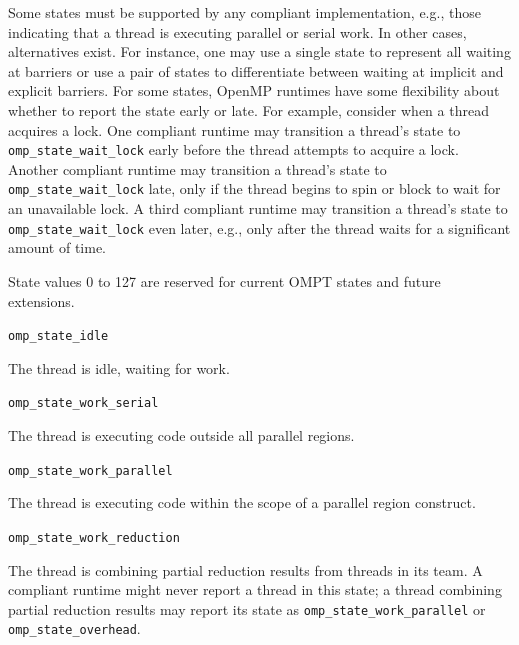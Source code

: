 \documentclass{article}
\newcommand{\descheader}[1]{{\needspace{3\baselineskip}\vspace{1em}\noindent \fbox{#1}}}
\begin{document}
Some states must be supported by any compliant implementation, e.g., those indicating that a thread is executing parallel or serial work. In other cases, alternatives exist. For instance, one may use a single state to represent all waiting at barriers or use a pair of states to differentiate between waiting at implicit and explicit barriers.
For some states, OpenMP runtimes have some flexibility about whether to report the state early or late.
For example, consider when a thread acquires a lock. One
compliant runtime may transition a thread's state to 
\verb|omp_state_wait_lock|  early before the thread attempts to acquire a
lock. Another compliant runtime may transition a thread's state to
\verb|omp_state_wait_lock| late, only if the thread begins to spin or
block to wait for an unavailable lock. A third compliant runtime
may transition a thread's state to \verb|omp_state_wait_lock| even later, e.g., only
after the thread waits for a significant amount of time. 

State values 0 to 127 are reserved for current OMPT states and future extensions.  

\descheader{Idle State}

\begin{description}
\item \verb|omp_state_idle| 

  The thread is idle, waiting for work.
\end{description}

\descheader{Work States}

\begin{description}

\item \verb|omp_state_work_serial| 

  The thread is executing code outside all parallel regions. 

\item \verb|omp_state_work_parallel| 

  The thread is executing code within the scope of a parallel region construct.

\sloppy
\item \verb|omp_state_work_reduction| 
 
  The thread is combining partial reduction results from threads in its team. A compliant
  runtime might never report a thread in this state; a thread
  combining partial reduction results may  report its state as
  \verb|omp_state_work_parallel| or \verb|omp_state_overhead|.

\end{description}
\end{document}
